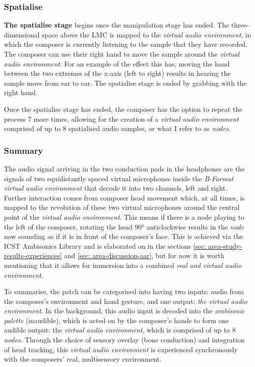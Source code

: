\subsubsection{Spatialise}                      \label{sec: area-system-software-spatialise}
\textbf{The spatialise stage} begins once the manipulation stage has ended. The three-dimensional space above the LMC is mapped to the \textit{virtual audio environment}, in which the composer is currently listening to the sample that they have recorded. The composer can use their right hand to move the sample around the \textit{virtual audio environment}. For an example of the effect this has, moving the hand between the two extremes of the x-axis (left to right) results in hearing the sample move from ear to ear. The spatialise stage is ended by grabbing with the right hand.

Once the spatialise stage has ended, the composer has the option to repeat the process 7 more times, allowing for the creation of a \textit{virtual audio environment} comprised of up to 8 spatialised audio samples, or what I refer to as \textit{nodes}. 

\subsubsection{Summary}                         \label{sec: area-system-software-summary}
The audio signal arriving in the two conduction pads in the headphones are the signals of two equidistantly spaced virtual microphones inside the \textit{B-Format virtual audio environment} that decode it into two channels, left and right. Further interaction comes from composer head movement which, at all times, is mapped to the revolution of these two virtual microphones around the central point of the \textit{virtual audio environment}. This means if there is a node playing to the left of the composer, rotating the head 90° anticlockwise results in the \textit{node} now sounding as if it is in front of the composer’s face. This is achieved via the ICST Ambisonics Library \citep{schacher2006} and is elaborated on in the sections \autoref{sec: area-study-results-experiences} and \autoref{sec: area-discussion-aar}, but for now it is worth mentioning that it allows for immersion into a combined \textit{real and virtual audio environment}.

To summarise, the patch can be categorised into having two inputs: audio from the composer’s environment and hand gesture, and one output: \textit{the virtual audio environment}. In the background, this audio input is decoded into the \textit{ambisonic palette} (inaudible), which is acted on by the composer’s hands to form one audible output: the \textit{virtual audio environment}, which is comprised of up to 8 \textit{nodes}. Through the choice of sensory overlay (bone conduction) and integration of head tracking, this \textit{virtual audio environment} is experienced synchronously with the composers’ real, multisensory environment. 



